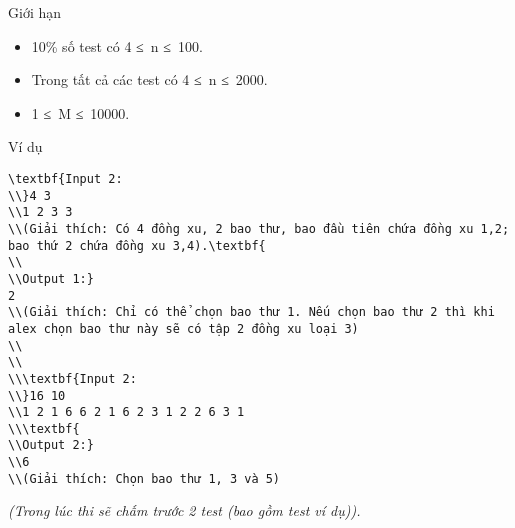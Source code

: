 Giới hạn
\begin{itemize}
	\item     10\% số test có 4 ≤ n ≤ 100.   
	\item     Trong tất cả các test có 4 ≤ n ≤ 2000.   
	\item     1 ≤ M ≤ 10000.   
\end{itemize}
\begin{itemize}
\end{itemize}
Ví dụ
\begin{verbatim}
\textbf{Input 2:
\\}4 3
\\1 2 3 3
\\(Giải thích: Có 4 đồng xu, 2 bao thư, bao đầu tiên chứa đồng xu 1,2; bao thứ 2 chứa đồng xu 3,4).\textbf{
\\
\\Output 1:}
2
\\(Giải thích: Chỉ có thể chọn bao thư 1. Nếu chọn bao thư 2 thì khi alex chọn bao thư này sẽ có tập 2 đồng xu loại 3)
\\
\\
\\\textbf{Input 2:
\\}16 10
\\1 2 1 6 6 2 1 6 2 3 1 2 2 6 3 1
\\\textbf{
\\Output 2:}
\\6
\\(Giải thích: Chọn bao thư 1, 3 và 5)\end{verbatim}

\emph{    (Trong lúc thi sẽ chấm trước 2 test (bao gồm test ví dụ)).   }
